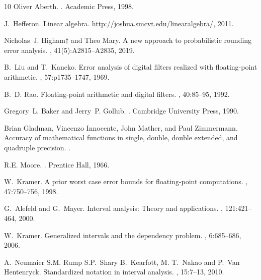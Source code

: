 \documentclass[twoside]{article}
\numberwithin{equation}{section}
\begin{document}
\begin{thebibliography}{10}
Oliver Aberth.
.
\newblock Academic Press, 1998.

J.~Hefferon.
\newblock Linear algebra.
\newblock \url{http://joshua.smcvt.edu/linearalgebra/}, 2011.

Nicholas~J. Higham† and Theo Mary.
\newblock A new approach to probabilistic rounding error analysis.
, 41(5):A2815--A2835, 2019.

B.~Liu and T.~Kaneko.
\newblock Error analysis of digital filters realized with floating-point
  arithmetic.
, 57:p1735--1747, 1969.

B.~D. Rao.
\newblock Floating-point arithmetic and digital filters.
, 40:85--95, 1992.

Gregory~L. Baker and Jerry~P. Gollub.
.
\newblock Cambridge University Press, 1990.

Brian Gladman, Vincenzo Innocente, John Mather, and Paul Zimmermann.
\newblock Accuracy of mathematical functions in single, double, double
  extended, and quadruple precision.
.

R.E. Moore.
.
\newblock Prentice Hall, 1966.

W.~Kramer.
\newblock A prior worst case error bounds for floating-point computations.
, 47:750--756, 1998.

G.~Alefeld and G.~Mayer.
\newblock Interval analysis: Theory and applications.
, 121:421--464,
  2000.

W.~Kramer.
\newblock Generalized intervals and the dependency problem.
, 6:685--686,
  2006.

A.~Neumaier S.M. Rump S.P.~Shary B.~Kearfott, M. T.~Nakao and P.~Van
  Hentenryck.
\newblock Standardized notation in interval analysis.
, 15:7--13, 2010.


\end{thebibliography}
\end{document}
